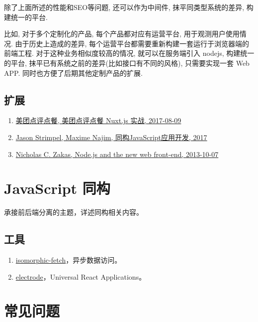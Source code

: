 除了上面所述的性能和SEO等问题, 还可以作为中间件, 抹平同类型系统的差异,
构建统一的平台.

比如, 对于多个定制化的产品, 每个产品都对应有运营平台,
用于观测用户使用情况. 由于历史上造成的差异,
每个运营平台都需要重新构建一套运行于浏览器端的前端工程.
对于这种业务相似度较高的情况, 就可以在服务端引入 nodejs, 构建统一的平台,
抹平已有系统之前的差异(比如接口有不同的风格), 只需要实现一套 Web APP.
同时也方便了后期其他定制产品的扩展.

\subsection{扩展}\label{ux6269ux5c55-1}

\begin{enumerate}
\def\labelenumi{\arabic{enumi}.}
\tightlist
\item
  \href{https://juejin.im/post/598aabe96fb9a03c335a8dde}{美团点评点餐,
  美团点评点餐 Nuxt.js 实战, 2017-08-09}
\item
  \href{https://book.douban.com/subject/27183584/}{Jason Strimpel,
  Maxime Najim, 同构JavaScript应用开发, 2017}
\item
  \href{https://www.nczonline.net/blog/2013/10/07/node-js-and-the-new-web-front-end/}{Nicholas
  C. Zakas, Node.js and the new web front-end, 2013-10-07}
\end{enumerate}

\section{JavaScript 同构}\label{javascript-ux540cux6784}

承接前后端分离的主题，详述同构相关内容。

\subsection{工具}\label{ux5de5ux5177}

\begin{enumerate}
\def\labelenumi{\arabic{enumi}.}
\tightlist
\item
  \href{https://github.com/matthew-andrews/isomorphic-fetch}{isomorphic-fetch}，异步数据访问。
\item
  \href{https://github.com/electrode-io/electrode}{electrode}，Universal
  React Applications。
\end{enumerate}

\section{常见问题}\label{ux5e38ux89c1ux95eeux9898}

